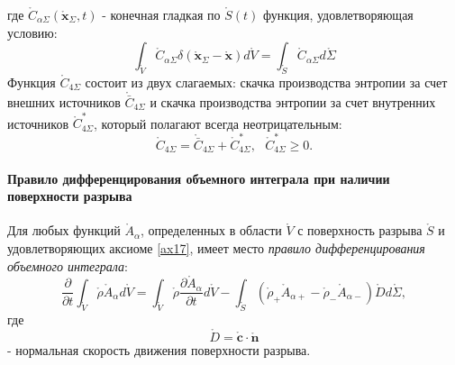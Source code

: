 \begin{axiom}
\begin{equation}
	\end{equation}
	где $\mathring{C}_{\alpha\Sigma}(\mathring{\mathbf{x}}_\Sigma,t)$ - конечная гладкая по $\mathring{S}(t)$ функция, удовлетворяющая условию:
	\begin{equation}\label{eq18}
	\int_{\mathring{V}}\mathring{C}_{\alpha\Sigma}\delta(\mathring{\mathbf{x}}_\Sigma-\mathring{\mathbf{x}})d\mathring{V}=\int_{\mathring{S}}\mathring{C}_{\alpha\Sigma}d\mathring{\Sigma}
	\end{equation}
	Функция $\mathring{C}_{4\Sigma}$ состоит из двух слагаемых: скачка производства энтропии за счет внешних источников $\mathring{\bar{C}}_{4\Sigma}$ и скачка производства энтропии за
	счет внутренних источников $\mathring{C}_{4\Sigma}^*$, который полагают всегда неотрицательным:
	\[
	\mathring{C}_{4\Sigma}=\mathring{\bar{C}}_{4\Sigma}+\mathring{C}_{4\Sigma}^*,~~~\mathring{C}_{4\Sigma}^*\geq 0.
	\]
\end{axiom}
	\paragraph{Правило дифференцирования объемного интеграла при наличии поверхности разрыва}
	\begin{theorem}\label{th11}
		Для любых функций $\mathring{A}_\alpha$, определенных в области $\mathring{V}$ с поверхность разрыва $\mathring{S}$ и удовлетворяющих аксиоме \ref{ax17}, имеет место \textit{правило дифференцирования объемного интеграла}:
		\begin{equation}\label{eq116}
		\frac{\partial}{\partial t}\int_{\mathring{V}}\mathring{\rho}\mathring{A}_\alpha d\mathring{V}=\int_{\mathring{V}}\mathring{\rho}	\frac{\partial\mathring{A}_\alpha}{\partial t}d\mathring{V}-\int_{\mathring{S}}\left(\mathring{\rho}_+\mathring{A}_{\alpha+}-\mathring{\rho}_-\mathring{A}_{\alpha-}\right)\mathring{D}d\mathring{\Sigma},
		\end{equation}
		где
		\[
			\mathring{D}=\mathring{\mathbf{c}}\cdot\mathring{\mathbf{n}}
		\]
		- нормальная скорость движения поверхности разрыва.
	\end{theorem}